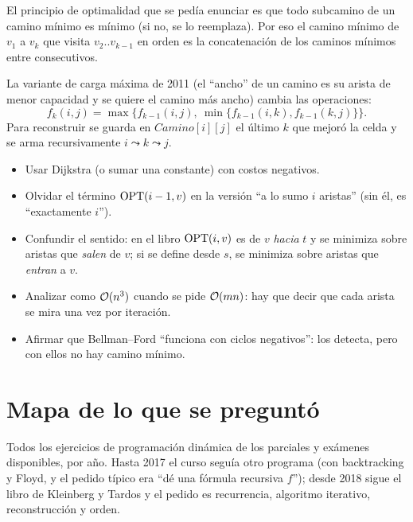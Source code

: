 El principio de optimalidad que se pedía enunciar es que todo subcamino de
un camino mínimo es mínimo (si no, se lo reemplaza). Por eso el camino
mínimo de $v_1$ a $v_k$ que visita $v_2..v_{k-1}$ en orden es la
concatenación de los caminos mínimos entre consecutivos.

La variante de carga máxima de 2011 (el ``ancho'' de un camino es su arista
de menor capacidad y se quiere el camino más ancho) cambia las operaciones:
\[
f_k(i,j)=\max\bigl\{f_{k-1}(i,j),\ \min\{f_{k-1}(i,k),f_{k-1}(k,j)\}\bigr\}.
\]
Para reconstruir se guarda en $\mathit{Camino}[i][j]$ el último $k$ que mejoró la
celda y se arma recursivamente $i\leadsto k\leadsto j$.

\begin{trampa}
\begin{itemize}[leftmargin=1.2em]
  \item Usar Dijkstra (o sumar una constante) con costos negativos.
  \item Olvidar el término $\mathrm{OPT}(i-1,v)$ en la versión ``a lo sumo $i$
  aristas'' (sin él, es ``exactamente $i$'').
  \item Confundir el sentido: en el libro $\mathrm{OPT}(i,v)$ es de $v$ \emph{hacia}
  $t$ y se minimiza sobre aristas que \emph{salen} de $v$; si se define desde
  $s$, se minimiza sobre aristas que \emph{entran} a $v$.
  \item Analizar como $\mathcal{O}(n^3)$ cuando se pide $\mathcal{O}(mn)$: hay que decir que
  cada arista se mira una vez por iteración.
  \item Afirmar que Bellman--Ford ``funciona con ciclos negativos'': los
  detecta, pero con ellos no hay camino mínimo.
\end{itemize}
\end{trampa}

\section{Mapa de lo que se preguntó}

Todos los ejercicios de programación dinámica de los parciales y exámenes
disponibles, por año. Hasta 2017 el curso seguía otro programa (con
backtracking y Floyd, y el pedido típico era ``dé una fórmula recursiva
$f$''); desde 2018 sigue el libro de Kleinberg y Tardos y el pedido es
recurrencia, algoritmo iterativo, reconstrucción y orden.


